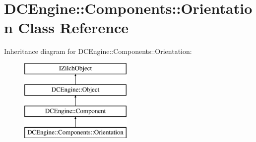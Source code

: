 \hypertarget{classDCEngine_1_1Components_1_1Orientation}{\section{D\-C\-Engine\-:\-:Components\-:\-:Orientation Class Reference}
\label{classDCEngine_1_1Components_1_1Orientation}
}
Inheritance diagram for D\-C\-Engine\-:\-:Components\-:\-:Orientation\-:\begin{figure}[H]
\begin{center}
\leavevmode
\includegraphics[height=4.000000cm]{classDCEngine_1_1Components_1_1Orientation}
\end{center}
\end{figure}
